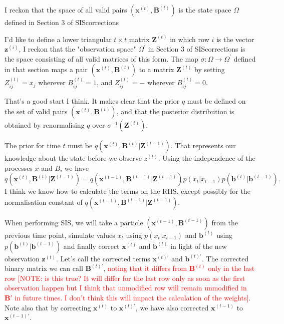 \documentclass[11pt,a4paper]{article}
\renewcommand{\vec}[1]{\mathbf{#1}}
\begin{document}
I reckon that the space of all valid pairs $(\vec{x}^{(t)}, \vec{B}^{(t)})$ is the state space $\Omega$ defined in Section 3 of SIScorrections

I'd like to define a lower triangular $t \times t$ matrix $\vec{Z}^{(t)}$ in which row $i$ is the vector $\vec{z}^{(i)}$, I reckon that the "observation space" $\Omega^{\prime}$ in Section 3 of SIScorrections is the space consisting of all valid matrices of this form. The map $\sigma: \Omega \rightarrow \Omega^{\prime}$ defined in that section maps a pair $(\vec{x}^{(t)}, \vec{B}^{(t)})$ to a matrix $\vec{Z}^{(t)}$ by setting $Z_{ij}^{(t)} = x_j$ wherever $B_{ij}^{(t)} = 1$, and $Z_{ij}^{(t)} = -$ wherever $B_{ij}^{(t)} = 0$.

That's a good start I think. It makes clear that the prior $q$ must be defined on the set of valid pairs $(\vec{x}^{(t)}, \vec{B}^{(t)})$, and that the posterior distribution is obtained by renormalising $q$ over $\sigma^{-1}(\vec{Z}^{(t)})$.

The prior for time $t$ must be $q(\vec{x}^{(t)},\vec{B}^{(t)} | \vec{Z}^{(t-1)})$. That represents our knowledge about the state before we observe $z^{(t)}$. Using the independence of the processes $x$ and $B$, we have
\[
q(\vec{x}^{(t)},\vec{B}^{(t)} | \vec{Z}^{(t-1)}) = q(\vec{x}^{(t-1)},\vec{B}^{(t-1)} | \vec{Z}^{(t-1)}) p(x_t | x_{t-1}) p(\vec{b}^{(t)} | \vec{b}^{(t-1)}).
\]
I think we know how to calculate the terms on the RHS, except possibly for the normalisation constant of $q(\vec{x}^{(t-1)},\vec{B}^{(t-1)} | \vec{Z}^{(t-1)})$.

When performing SIS, we will take a particle $(\vec{x}^{(t-1)},\vec{B}^{(t-1)})$ from the previous time point, simulate values $x_t$ using $p(x_t | x_{t-1})$ and $\vec{b}^{(t)}$ using $p(\vec{b}^{(t)} | \vec{b}^{(t-1)})$ and finally correct $\vec{x}^{(t)}$ and $\vec{b}^{(t)}$ in light of the new observation $\vec{z}^{(t)}$. Let's call the corrected terms $\vec{x}^{(t)\prime}$ and $\vec{b}^{(t)\prime}$. The corrected binary matrix we can call $\vec{B}^{(t)\prime}$, \textcolor{red}{noting that it differs from $\vec{B}^{(t)}$ only in the last row [NOTE: is this true? It will differ for the last row only as soon as the first observation happen but I think that unmodified row will remain unmodified in $\vec{B}'$ in future times. I don't think this will impact the calculation of the weights]}. Note also that by correcting $\vec{x}^{(t)}$ to $\vec{x}^{(t)\prime}$, we have also corrected $\vec{x}^{(t-1)}$ to $\vec{x}^{(t-1)\prime}$.
\end{document}
